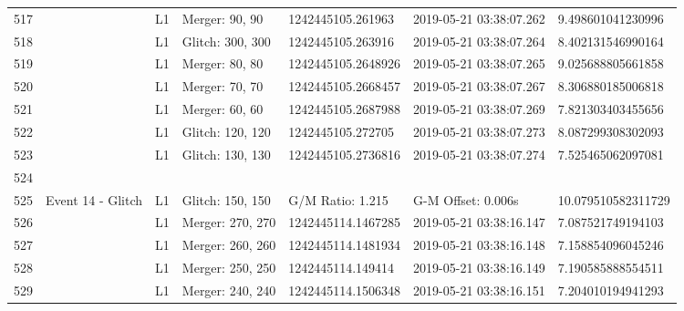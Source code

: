 \begin{longtable}{lllllll}
517  &                                                    &       L1 &    Merger: 90, 90 &   1242445105.261963 &  2019-05-21 03:38:07.262 &   9.498601041230996 \\
518  &                                                    &       L1 &  Glitch: 300, 300 &   1242445105.263916 &  2019-05-21 03:38:07.264 &   8.402131546990164 \\
519  &                                                    &       L1 &    Merger: 80, 80 &  1242445105.2648926 &  2019-05-21 03:38:07.265 &   9.025688805661858 \\
520  &                                                    &       L1 &    Merger: 70, 70 &  1242445105.2668457 &  2019-05-21 03:38:07.267 &   8.306880185006818 \\
521  &                                                    &       L1 &    Merger: 60, 60 &  1242445105.2687988 &  2019-05-21 03:38:07.269 &   7.821303403455656 \\
522  &                                                    &       L1 &  Glitch: 120, 120 &   1242445105.272705 &  2019-05-21 03:38:07.273 &   8.087299308302093 \\
523  &                                                    &       L1 &  Glitch: 130, 130 &  1242445105.2736816 &  2019-05-21 03:38:07.274 &   7.525465062097081 \\
524  &                                                    &          &                   &                     &                          &                     \\
525  &                                  Event 14 - Glitch &       L1 &  Glitch: 150, 150 &    G/M Ratio: 1.215 &       G-M Offset: 0.006s &  10.079510582311729 \\
526  &                                                    &       L1 &  Merger: 270, 270 &  1242445114.1467285 &  2019-05-21 03:38:16.147 &   7.087521749194103 \\
527  &                                                    &       L1 &  Merger: 260, 260 &  1242445114.1481934 &  2019-05-21 03:38:16.148 &   7.158854096045246 \\
528  &                                                    &       L1 &  Merger: 250, 250 &   1242445114.149414 &  2019-05-21 03:38:16.149 &   7.190585888554511 \\
529  &                                                    &       L1 &  Merger: 240, 240 &  1242445114.1506348 &  2019-05-21 03:38:16.151 &   7.204010194941293 \\

\end{longtable}
